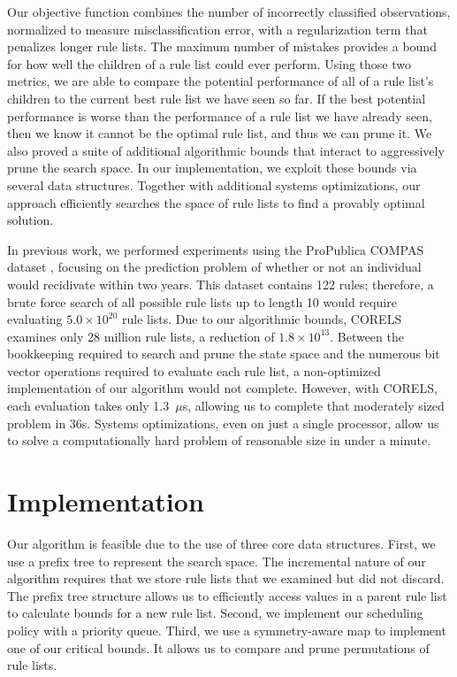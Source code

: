 \documentclass[format=sigconf]{acmart}
\begin{document}
Our objective function combines the number of incorrectly classified observations, normalized to measure misclassification error, with a regularization term that penalizes longer rule lists.
The maximum number of mistakes provides a bound for how well the children of a rule list could ever perform.
Using those two metrics, we are able to compare the potential performance of all of a rule list's children to the current best rule list we have seen so far.
If the best potential performance is worse than the performance of a rule list we have already seen, then we know it cannot be the optimal rule list, and thus we can prune it.
We also proved a suite of additional algorithmic bounds that interact to aggressively prune the search space.
In our implementation, we exploit these bounds via several data structures.  
Together with additional systems optimizations, our approach efficiently searches the space of rule lists to find a provably optimal solution.

In previous work, we performed experiments using the ProPublica COMPAS dataset \cite{LarsonMaKiAn16}, focusing on the prediction problem of whether or not an individual would recidivate within two years.
This dataset contains 122 rules; therefore, a brute force search of all possible rule lists up to length 10 would require evaluating ${5.0 \times 10^{20}}$ rule lists.
Due to our algorithmic bounds, CORELS examines only 28 million rule lists, a reduction of ${1.8 \times 10^{13}}$.
Between the bookkeeping required to search and prune the state space and the numerous bit vector operations required to evaluate each rule list, a non-optimized implementation of our algorithm would not complete.
However, with CORELS, each evaluation takes only 1.3~$\mu$s, allowing us to complete that moderately sized problem in 36s.
Systems optimizations, even on just a single processor, allow us to solve a computationally hard problem of reasonable size in under a minute.

\section{Implementation}
Our algorithm is feasible due to the use of three core data structures.
First, we use a prefix tree to represent the search space.
The incremental nature of our algorithm requires that we store rule lists that we examined but did not discard.
The prefix tree structure allows us to efficiently access values in a parent rule list to calculate bounds for a new rule list.
Second, we implement our scheduling policy with a priority queue.
Third, we use a symmetry-aware map to implement one of our critical bounds.
It allows us to compare and prune permutations of rule lists.
\end{document}
